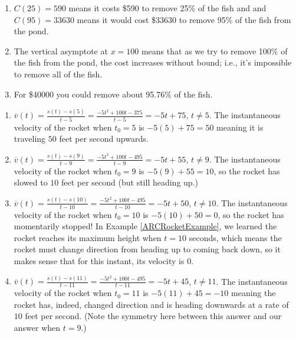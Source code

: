 \begin{exenum}

\item \begin{enumerate}

\item $C(25) = 590$ means it costs \$590 to remove 25\% of the fish and and $C(95)= 33630$ means it would cost \$33630 to remove 95\% of the fish from the pond.
\item The vertical asymptote at $x = 100$ means that as we try to remove 100\% of the fish from the pond, the cost increases without bound; i.e., it's impossible to remove all of the fish.
\item For \$40000 you could remove about 95.76\% of the fish.

\end{enumerate}

\item  \begin{enumerate}

\item  $\overline{v}(t) = \frac{s(t) - s(5)}{t - 5} = \frac{-5t^2+100t-375}{t-5} = -5t+75$, $t \neq 5$.  The instantaneous velocity of the rocket when $t_{0} = 5$ is $-5(5)+75 = 50$ meaning it is traveling $50$ feet per second upwards.

\item  $\overline{v}(t) = \frac{s(t) - s(9)}{t - 9} = \frac{-5t^2+100t-495}{t-9} = -5t+55$, $t \neq 9$.  The instantaneous velocity of the rocket when $t_{0} = 9$ is $-5(9)+55 = 10$, so the rocket has slowed to $10$ feet per second (but still heading up.)

\item $\overline{v}(t) = \frac{s(t) - s(10)}{t - 10} = \frac{-5t^2+100t-495}{t-10} = -5t+50$, $t \neq 10$.  The instantaneous velocity of the rocket when $t_{0} = 10$ is $-5(10)+50 = 0$, so the rocket has momentarily stopped!  In Example \ref{ARCRocketExample}, we learned the rocket reaches its maximum height when $t = 10$ seconds, which means the rocket must change direction from heading up to coming back down, so it makes sense that for this instant, its velocity is $0$.

\item  $\overline{v}(t) = \frac{s(t) - s(11)}{t - 11} = \frac{-5t^2+100t-495}{t-11} = -5t+45$, $t \neq 11$.  The instantaneous velocity of the rocket when $t_{0} = 11$ is $-5(11)+45 = -10$ meaning the rocket has, indeed, changed direction and is heading downwards at a rate of $10$ feet per second.  (Note the symmetry here between this answer and our answer when $t=9$.)


\end{enumerate}
\end{exenum}
